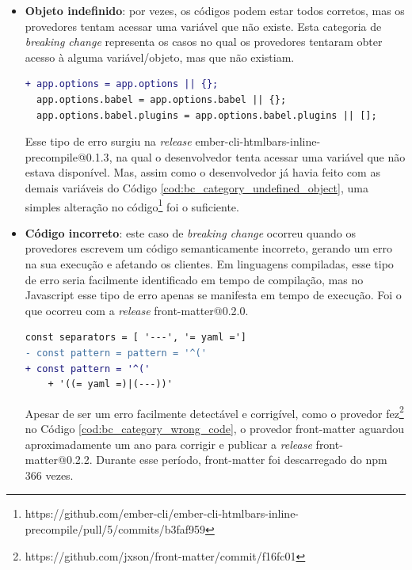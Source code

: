 \begin{itemize}
    \item \textbf{Objeto indefinido}: por vezes, os códigos podem estar todos corretos, mas os provedores tentam acessar uma variável que não existe. Esta categoria de \textit{breaking change} representa os casos no qual os provedores tentaram obter acesso à alguma variável/objeto, mas que não existiam.
    \vspace{0.4cm}
    \begin{lstlisting}[numbers=none, language=diff, label=cod:bc_category_undefined_object, caption={Exemplo da categoria de \textit{Objeto Indefinido}}]
+ app.options = app.options || {};
  app.options.babel = app.options.babel || {};
  app.options.babel.plugins = app.options.babel.plugins || [];
    \end{lstlisting}

    Esse tipo de erro surgiu na \textit{release} \textsf{ember-cli-htmlbars-inline-precompile@0.1.3}, na qual o desenvolvedor tenta acessar uma variável que não estava disponível. Mas, assim como o desenvolvedor já havia feito com as demais variáveis do Código \ref{cod:bc_category_undefined_object}, uma simples alteração no código\footnote{https://github.com/ember-cli/ember-cli-htmlbars-inline-precompile/pull/5/commits/b3faf959} foi o suficiente.

    \item \textbf{Código incorreto}: este caso de \textit{breaking change} ocorreu quando os provedores escrevem um código semanticamente incorreto, gerando um erro na sua execução e afetando os clientes. Em linguagens compiladas, esse tipo de erro seria facilmente identificado em tempo de compilação, mas no \textsf{Javascript} esse tipo de erro apenas se manifesta em tempo de execução. Foi o que ocorreu com a \textit{release} \textsf{front-matter@0.2.0}.
    \vspace{0.4cm}
	 \begin{lstlisting}[numbers=none, language=diff, label=cod:bc_category_wrong_code, caption={Exemplo da categoria \textit{Código incorreto}}]
  const separators = [ '---', '= yaml =']
- const pattern = pattern = '^('
+ const pattern = '^('
    + '((= yaml =)|(---))'
	 \end{lstlisting}

    Apesar de ser um erro facilmente detectável e corrigível, como o provedor fez\footnote{https://github.com/jxson/front-matter/commit/f16fc01} no Código \ref{cod:bc_category_wrong_code}, o provedor \textsf{front-matter} aguardou aproximadamente um ano para corrigir e publicar a \textit{release} \textsf{front-matter@0.2.2}. Durante esse período, \textsf{front-matter} foi descarregado do \textsf{npm} 366 vezes.


\end{itemize}
